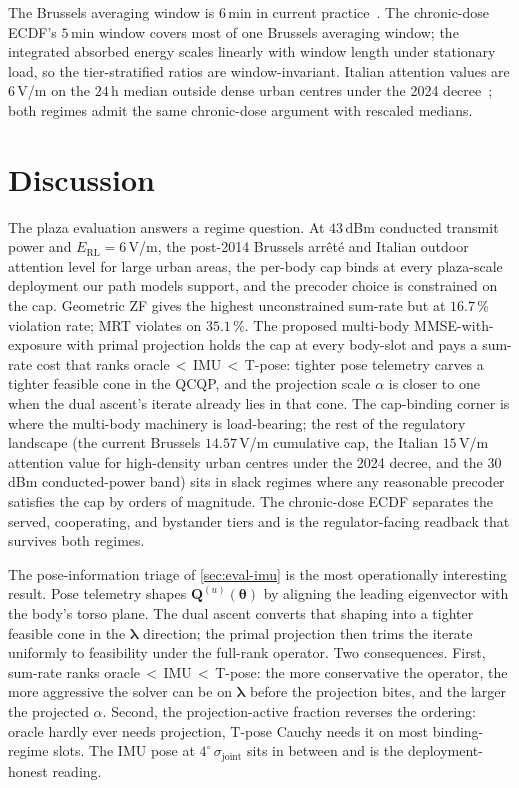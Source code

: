 \documentclass[journal,twocolumn,10pt]{IEEEtran}
\theoremstyle{plain}
\theoremstyle{remark}
\newcommand{\Qmat}{\mathbf{Q}}
\begin{document}
The Brussels averaging window is $6\,$min in current
practice~\cite{BrusselsArrete2024}. The chronic-dose ECDF's
$5\,$min window covers most of one Brussels averaging window;
the integrated absorbed energy scales linearly with window length
under stationary load, so the tier-stratified ratios are
window-invariant. Italian attention values are $6\,$V/m on the
$24\,$h median outside dense urban centres under the 2024
decree~\cite{ItalyDL}; both regimes admit the same chronic-dose
argument with rescaled medians.


\section{Discussion}\label{sec:discussion}

The plaza evaluation answers a regime question. At $43\,$dBm
conducted transmit power and $E_{\mathrm{RL}} = 6\,$V/m, the
post-2014 Brussels arr\^et\'e and Italian outdoor attention level
for large urban areas, the per-body cap binds at every plaza-scale
deployment our path models support, and the precoder choice is
constrained on the cap. Geometric ZF gives the highest
unconstrained sum-rate but at $16.7\,\%$ violation rate; MRT
violates on $35.1\,\%$. The proposed multi-body MMSE-with-exposure
with primal projection holds the cap at every body-slot and pays a
sum-rate cost that ranks oracle\,$<$\,IMU\,$<$\,T-pose: tighter
pose telemetry carves a tighter feasible cone in the QCQP, and the
projection scale $\alpha$ is closer to one when the dual ascent's
iterate already lies in that cone. The cap-binding corner is where
the multi-body machinery is load-bearing; the rest of the
regulatory landscape (the current Brussels $14.57\,$V/m
cumulative cap, the Italian $15\,$V/m attention value for
high-density urban centres under the 2024 decree, and the
$30\,$dBm conducted-power band) sits in slack regimes where any
reasonable precoder satisfies the cap by orders of magnitude. The chronic-dose ECDF separates the served,
cooperating, and bystander tiers and is the regulator-facing
readback that survives both regimes.

The pose-information triage of \cref{sec:eval-imu} is the most
operationally interesting result. Pose telemetry shapes
$\Qmat^{(u)}(\bm\theta)$ by aligning the leading eigenvector with
the body's torso plane. The dual ascent converts that shaping into
a tighter feasible cone in the $\bm\lambda$ direction; the primal
projection then trims the iterate uniformly to feasibility under
the full-rank operator. Two consequences. First, sum-rate ranks
oracle\,$<$\,IMU\,$<$\,T-pose: the more conservative the operator,
the more aggressive the solver can be on $\bm\lambda$ before the
projection bites, and the larger the projected $\alpha$. Second,
the projection-active fraction reverses the ordering: oracle
hardly ever needs projection, T-pose Cauchy needs it on most
binding-regime slots. The IMU pose at $4^\circ\,\sigma_{\mathrm{joint}}$
sits in between and is the deployment-honest reading.
\end{document}
